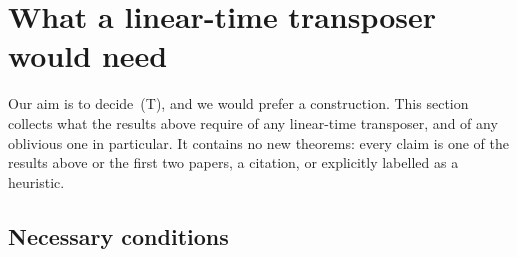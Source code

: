\section{What a linear-time transposer would need}\label{sec:construction}

Our aim is to decide~(T), and we would prefer a construction. This section collects what the results above require of
any linear-time transposer, and of any oblivious one in particular. It contains no new theorems: every claim is one of
the results above or the first two papers, a citation, or explicitly labelled as a heuristic.

\subsection{Necessary conditions}

